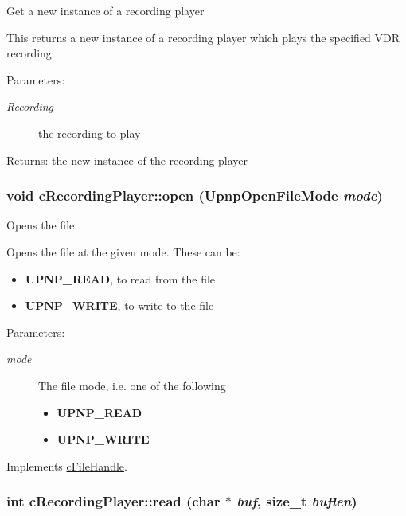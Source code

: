 Get a new instance of a recording player

This returns a new instance of a recording player which plays the specified VDR recording.

\begin{Desc}
\item[Parameters:]
\begin{description}
\item[{\em Recording}]the recording to play \end{description}
\end{Desc}
\begin{Desc}
\item[Returns:]the new instance of the recording player \end{Desc}
\hypertarget{classcRecordingPlayer_e7ad4362d821f38db5143c0aeff15d97}{
\subsubsection[{open}]{\setlength{\rightskip}{0pt plus 5cm}void cRecordingPlayer::open (UpnpOpenFileMode {\em mode})}}
\label{classcRecordingPlayer_e7ad4362d821f38db5143c0aeff15d97}


Opens the file

Opens the file at the given mode. These can be:\begin{itemize}
\item {\bf UPNP\_\-READ}, to read from the file\item {\bf UPNP\_\-WRITE}, to write to the file\end{itemize}


\begin{Desc}
\item[Parameters:]
\begin{description}
\item[{\em mode}]The file mode, i.e. one of the following\begin{itemize}
\item {\bf UPNP\_\-READ} \item {\bf UPNP\_\-WRITE} \end{itemize}
\end{description}
\end{Desc}


Implements \hyperlink{classcFileHandle_cdf4f4d07382de675b498d85544ea1b6}{cFileHandle}.\hypertarget{classcRecordingPlayer_e0fda8b0be8e47133698f1763e649b3d}{
\subsubsection[{read}]{\setlength{\rightskip}{0pt plus 5cm}int cRecordingPlayer::read (char $\ast$ {\em buf}, \/  size\_\-t {\em buflen})}}
\label{classcRecordingPlayer_e0fda8b0be8e47133698f1763e649b3d}


